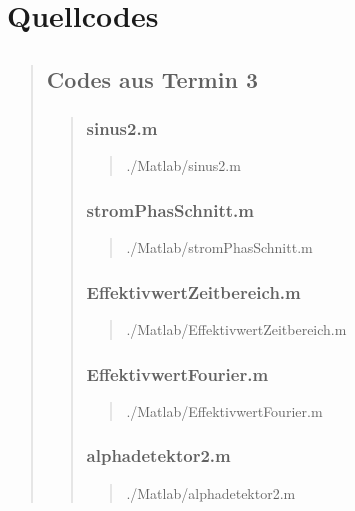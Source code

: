 \section{Quellcodes}
\begin{quote}
	
	\subsection{Codes aus Termin 3}
	\begin{quote}
	    \subsubsection{sinus2.m}
	    \begin{quote}
	        
	            {./Matlab/sinus2.m}
	    \end{quote}
    
	    \subsubsection{stromPhasSchnitt.m}
	    \begin{quote}
	        
	            {./Matlab/stromPhasSchnitt.m}
	    \end{quote}
    
	    \subsubsection{EffektivwertZeitbereich.m}
	    \begin{quote}
	        
	            {./Matlab/EffektivwertZeitbereich.m}
	    \end{quote}
    
	    \subsubsection{EffektivwertFourier.m}
	    \begin{quote}
	        
	            {./Matlab/EffektivwertFourier.m}
	    \end{quote}
	    \subsubsection{alphadetektor2.m}
        \begin{quote}
            
                {./Matlab/alphadetektor2.m}
        \end{quote}
        

\end{quote}
\end{quote}
